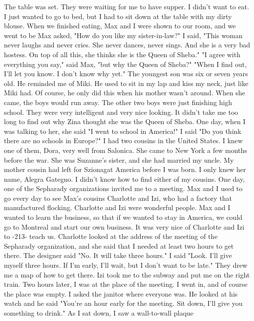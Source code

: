 The table was set.
They were waiting for me to have supper.
I didn't want to 
eat.
I just wanted to go to bed, but I had to sit down at the table with my dirty
blouse.
When we finished eating, Max and I were shown to our room, and we went to be 
Max asked, "How do you like my sister-in-law?"
I said, "This woman never laughs and never cries.
She never dances, never sings.
And she is a very bad hostess.
On top of all this, she thinks she is the Queen of 
Sheba."
"I agree with everything you say," said Max, "but why the Queen of Sheba?"
"When I find out, I'll let you know.
I don't know why yet."
The youngest son was six or seven years old.
He reminded me of Miki.
He used to 
sit in my lap and kiss my neck, just like Miki had.
Of course, he only did this when 
his mother wasn't around.
When she came, the boys would run away.
The other two 
boys were just finishing high school.
They were very intelligent and very nice looking.
It didn't take me too long to find out why Zina thought she was the Queen of Sheba.
One day, when I was talking to her, she said "I went to school in America!"
I said "Do you think there are no schools in Europe?"
I had two cousins in the United States.
I knew one of them, Dora, very well from 
Salonica.
She came to New York a few months before the war.
She was Suzanne's 
sister, and she had married my uncle.
My mother cousin had left for Szionagat America 
before I was born.
I only knew her name, Alegra Gategno.
I didn't know how to find 
either of my cousins.
One day, one of the Sepharady organizations invited me to a meeting.
Max and I 
used to go every day to see Max's cousins Charlotte and Izi, who had a factory that 
manufactured flocking.
Charlotte and Izi were wonderful people.
Max and I wanted to 
learn the business, so that if we wanted to stay in America, we could go to Montreal and start our own business.
It was very nice of Charlotte and Izi to 
-213- 
teach us.
Charlotte looked at the address of the meeting of the Sepharady organization, 
and she said that I needed at least two hours to get there.
The designer said "No.
It 
will take three hours."
I said "Look.
I’ll give myself three hours.
If I’m early, 
I’ll wait, but I don’t want to be late."
They drew me a map of how to get there.
Izi 
took me to the subway and put me on the right train.
Two hours later, I was at the place 
of the meeting.
I went in, and of course the place was empty.
I asked the janitor 
where everyone was.
He looked at his watch and he said "You're an hour early for the meeting.
Sit 
down, I'll give you something to drink."
As I sat down, I saw a wall-to-wall plaque 
